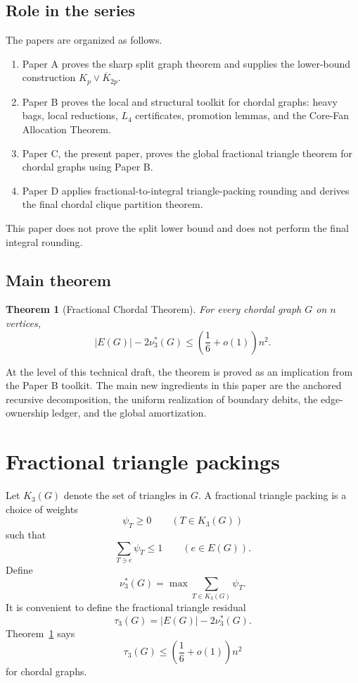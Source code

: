 \documentclass[11pt]{article}
\newtheorem{theorem}{Theorem}[section]
\theoremstyle{definition}
\begin{document}
\subsection*{Role in the series}

The papers are organized as follows.

\begin{enumerate}[label=(\Alph*)]
    \item Paper A proves the sharp split graph theorem and supplies the lower-bound construction \(K_p\vee\overline{K}_{2p}\).
    \item Paper B proves the local and structural toolkit for chordal graphs: heavy bags, local reductions, \(L_4\) certificates, promotion lemmas, and the Core-Fan Allocation Theorem.
    \item Paper C, the present paper, proves the global fractional triangle theorem for chordal graphs using Paper B.
    \item Paper D applies fractional-to-integral triangle-packing rounding and derives the final chordal clique partition theorem.
\end{enumerate}

This paper does not prove the split lower bound and does not perform the final integral rounding.

\subsection*{Main theorem}

\begin{theorem}[Fractional Chordal Theorem]\label{thm:fractional-main}
For every chordal graph \(G\) on \(n\) vertices,
\[
    |E(G)|-2\nu_3^*(G)
    \le
    \left(\frac16+o(1)\right)n^2.
\]
\end{theorem}

At the level of this technical draft, the theorem is proved as an implication from the Paper B toolkit. The main new ingredients in this paper are the anchored recursive decomposition, the uniform realization of boundary debits, the edge-ownership ledger, and the global amortization.

\section{Fractional triangle packings}

Let \(K_3(G)\) denote the set of triangles in \(G\). A fractional triangle packing is a choice of weights
\[
    \psi_T\ge0
    \qquad
    (T\in K_3(G))
\]
such that
\[
    \sum_{T\ni e}\psi_T\le1
    \qquad
    (e\in E(G)).
\]
Define
\[
    \nu_3^*(G)=
    \max\sum_{T\in K_3(G)}\psi_T.
\]
It is convenient to define the fractional triangle residual
\[
    \tau_3(G)=|E(G)|-2\nu_3^*(G).
\]
Theorem~\ref{thm:fractional-main} says
\[
    \tau_3(G)\le \left(\frac16+o(1)\right)n^2
\]
for chordal graphs.
\end{document}
